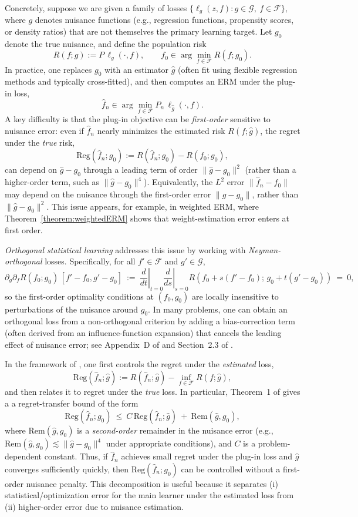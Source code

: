 \documentclass[11pt]{article}
\newcommand{\Reg}{\mathrm{Reg}}
\newcommand{\Rem}{\mathrm{Rem}}
\theoremstyle{plain}
\theoremstyle{definition} %
\begin{document}
Concretely, suppose we are given a family of losses
$\{\ell_{g}(z,f): g\in\mathcal{G},\ f\in\mathcal{F}\}$, where $g$ denotes nuisance
functions (e.g., regression functions, propensity scores, or density ratios) that
are not themselves the primary learning target. Let $g_0$ denote the true
nuisance, and define the population risk
\[
R(f; g) := P\,\ell_{g}(\cdot,f), \qquad
f_0 \in \arg\min_{f\in\mathcal{F}} R(f; g_0).
\]
In practice, one replaces $g_0$ with an estimator $\hat g$ (often fit using
flexible regression methods and typically cross-fitted), and then computes an
ERM under the plug-in loss,
\[
\hat f_n \in \arg\min_{f\in\mathcal{F}} P_n\,\ell_{\hat g}(\cdot,f).
\]
A key difficulty is that the plug-in objective can be \emph{first-order}
sensitive to nuisance error: even if \(\hat f_n\) nearly minimizes the estimated
risk $R(f; \hat g)$, the regret under the \emph{true} risk,
\[
\Reg(\hat f_n;g_0) := R(\hat f_n;g_0)-R(f_0;g_0),
\]
can depend on \(\hat g-g_0\) through a leading term of order \(\|\hat g-g_0\|^2\)
(rather than a higher-order term, such as \(\|\hat g-g_0\|^4\)). Equivalently,
the \(L^2\) error \(\|\hat f_n-f_0\|\) may depend on the nuisance through the
first-order error \(\|\hat g-g_0\|\), rather than \(\|\hat g-g_0\|^2\). This issue
appears, for example, in weighted ERM, where Theorem~\ref{theorem:weightedERM}
shows that weight-estimation error enters at first order.


\textit{Orthogonal statistical learning} \citep{foster2023orthogonal} addresses
this issue by working with \emph{Neyman-orthogonal} losses. Specifically, for all
$f'\in\mathcal{F}$ and $g'\in\mathcal{G}$,
\[
\partial_{g}\partial_f R(f_0; g_0)\,[f'-f_0,g'-g_0]
\ :=\
\left.\frac{d}{dt}\right|_{t=0}\left.\frac{d}{ds}\right|_{s=0}
R\left(f_0+s (f'-f_0);\, g_0+t(g'-g_0)\right)
\ =\ 0,
\]
so the first-order optimality conditions at $(f_0,g_0)$ are locally insensitive
to perturbations of the nuisance around $g_0$. In many problems, one can obtain
an orthogonal loss from a non-orthogonal criterion by adding a bias-correction
term (often derived from an influence-function expansion) that cancels
the leading effect of nuisance error; see Appendix~D of
\citet{foster2023orthogonal} and Section~2.3 of \citet{van2024combining}.

In the framework of \citet{foster2023orthogonal}, one first controls the regret
under the \emph{estimated} loss,
\[
\Reg(\hat f_n;\hat g) := R(\hat f_n; \hat g) - \inf_{f\in\mathcal{F}} R(f; \hat g),
\]
and then relates it to regret under the \emph{true} loss. In particular,
Theorem~1 of \citet{foster2023orthogonal} gives a a regret-transfer bound of the form
\[
\Reg(\hat f_n;g_0)
\ \le\
C\,\Reg(\hat f_n;\hat g)
\ +\
\Rem(\hat g,g_0),
\]
where $\Rem(\hat g,g_0)$ is a \emph{second-order} remainder in the nuisance error
(e.g., $\Rem(\hat g,g_0)\lesssim \|\hat g-g_0\|^4$ under appropriate conditions), and $C$ is a problem-dependent constant. Thus, if $\hat f_n$
achieves small regret under the plug-in loss and $\hat g$ converges
sufficiently quickly, then $\Reg(\hat f_n;g_0)$ can be controlled without a
first-order nuisance penalty. This decomposition is useful because it separates
(i) statistical/optimization error for the main learner under the estimated loss
from (ii) higher-order error due to nuisance estimation.
\end{document}
